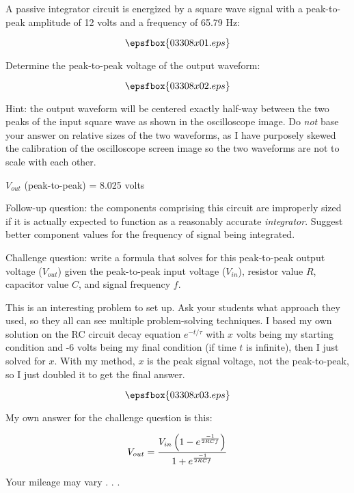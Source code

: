 

A passive integrator circuit is energized by a square wave signal with a peak-to-peak amplitude of 12 volts and a frequency of 65.79 Hz:

$$\epsfbox{03308x01.eps}$$

Determine the peak-to-peak voltage of the output waveform:

$$\epsfbox{03308x02.eps}$$

Hint: the output waveform will be centered exactly half-way between the two peaks of the input square wave as shown in the oscilloscope image.  Do {\it not} base your answer on relative sizes of the two waveforms, as I have purposely skewed the calibration of the oscilloscope screen image so the two waveforms are not to scale with each other.







$V_{out}$ (peak-to-peak) = 8.025 volts

\vskip 10pt

Follow-up question: the components comprising this circuit are improperly sized if it is actually expected to function as a reasonably accurate {\it integrator}.  Suggest better component values for the frequency of signal being integrated.

\vskip 10pt

Challenge question: write a formula that solves for this peak-to-peak output voltage ($V_{out}$) given the peak-to-peak input voltage ($V_{in}$), resistor value $R$, capacitor value $C$, and signal frequency $f$.







This is an interesting problem to set up.  Ask your students what approach they used, so they all can see multiple problem-solving techniques.  I based my own solution on the RC circuit decay equation $e^{-t / \tau}$ with $x$ volts being my starting condition and -6 volts being my final condition (if time $t$ is infinite), then I just solved for $x$.  With my method, $x$ is the peak signal voltage, not the peak-to-peak, so I just doubled it to get the final answer.

$$\epsfbox{03308x03.eps}$$

My own answer for the challenge question is this:

$$V_{out} = {{V_{in}\left(1 - e^{-1 \over 2RCf}\right)} \over {1 + e^{-1 \over 2RCf}}}$$

Your mileage may vary . . .




